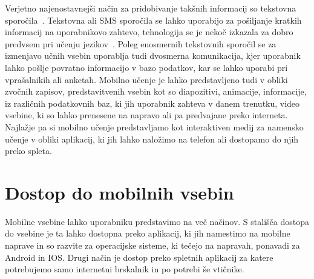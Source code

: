 \documentclass[a4paper, 12pt]{book}
\begin{document}
Verjetno najenostavnejši način za pridobivanje takšnih informacij so tekstovna sporočila~\cite{MLcat}. Tekstovna ali SMS sporočila se lahko uporabijo za pošiljanje kratkih informacij na uporabnikovo zahtevo, tehnologija se je nekoč izkazala za dobro predvsem pri učenju jezikov~\cite{ItSMS}. Poleg enosmernih tekstovnih sporočil se za izmenjavo učnih vsebin uporablja tudi dvosmerna komunikacija, kjer uporabnik lahko pošlje povratno informacijo v bazo podatkov, kar se lahko uporabi pri vprašalnikih ali anketah. Mobilno učenje je lahko predstavljeno tudi v obliki zvočnih zapisov, predstavitvenih vsebin kot so diapozitivi, animacije, informacije, iz različnih podatkovnih baz, ki jih uporabnik zahteva v danem trenutku, video vsebine, ki so lahko prenesene na napravo ali pa predvajane preko interneta. \\Najlažje pa si mobilno učenje predstavljamo kot interaktiven medij za namensko učenje v obliki aplikacij, ki jih lahko naložimo na telefon ali dostopamo do njih preko spleta.

\section{Dostop do mobilnih vsebin}
Mobilne vsebine lahko uporabniku predstavimo na več načinov. S stališča dostopa do vsebine je ta lahko dostopna preko aplikacij, ki jih namestimo na mobilne naprave in so razvite za operacijske sisteme, ki tečejo na napravah, ponavadi za Android in IOS. Drugi način je dostop preko spletnih aplikacij za katere potrebujemo samo internetni brskalnik in po potrebi še vtičnike. 
\end{document}
